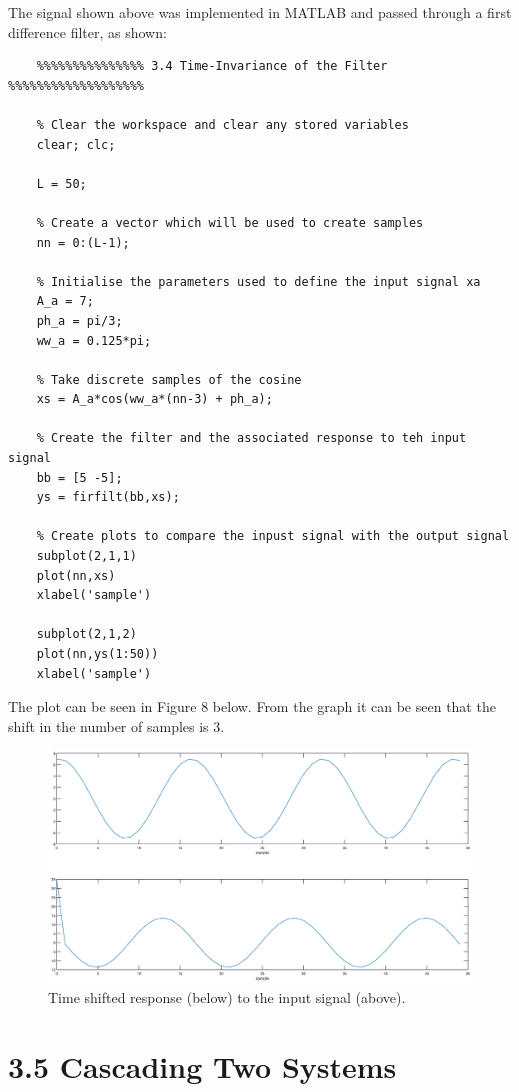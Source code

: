 \documentclass{article}
\begin{document}
The signal shown above was implemented in MATLAB and passed through a first difference filter, as shown:
\begin{lstlisting}
	%%%%%%%%%%%%%%% 3.4 Time-Invariance of the Filter %%%%%%%%%%%%%%%%%%%
	
	% Clear the workspace and clear any stored variables
	clear; clc;
	
	L = 50;
	
	% Create a vector which will be used to create samples
	nn = 0:(L-1);
	
	% Initialise the parameters used to define the input signal xa
	A_a = 7;
	ph_a = pi/3;
	ww_a = 0.125*pi;
	
	% Take discrete samples of the cosine
	xs = A_a*cos(ww_a*(nn-3) + ph_a);
	
	% Create the filter and the associated response to teh input signal
	bb = [5 -5];
	ys = firfilt(bb,xs);
	
	% Create plots to compare the inpust signal with the output signal
	subplot(2,1,1)
	plot(nn,xs)
	xlabel('sample')
	
	subplot(2,1,2)
	plot(nn,ys(1:50))
	xlabel('sample')
\end{lstlisting}

The plot can be seen in Figure 8 below. From the graph it can be seen that the shift in the number of samples is 3.

\begin{figure}[H]
	\centering
	\includegraphics[scale=0.3]{fig8}
	\caption{Time shifted response (below) to the input signal (above).}
\end{figure}

\section{3.5 Cascading Two Systems}
\end{document}
